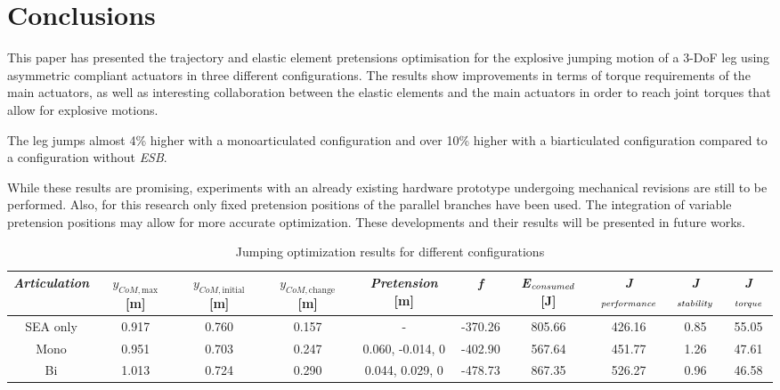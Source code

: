 \documentclass[letterpaper, 10 pt, conference]{ieeeconf}  %
\begin{document}
\section{Conclusions} \label{sec:conclusions} 

This paper has presented the trajectory and elastic element pretensions optimisation for the explosive jumping motion of a 3-DoF leg using asymmetric compliant actuators in three different configurations. The results show improvements in terms of torque requirements of the main actuators, as well as interesting collaboration between the elastic elements and the main actuators in order to reach joint torques that allow for explosive motions.

The leg jumps almost 4\% higher with a monoarticulated configuration and over 10\% higher with a biarticulated configuration compared to a configuration without \textit{ESB}.

While these results are promising, experiments with an already existing hardware prototype undergoing mechanical revisions are still to be performed. Also, for this research only fixed pretension positions of the parallel branches have been used. The integration of variable pretension positions may allow for more accurate optimization. These developments and their results will be presented in future works.

\begin{table}[ht]
	\caption{Jumping optimization results for different configurations}
	\label{maxheight}
	\begin{center}
		\begin{tabular}[t]{c|c|c||c|c|c|c|c|c|c}
			\textit{Articulation} &  $y_{CoM,\text{max}}$ [m] & $y_{CoM,\text{initial}}$ [m]& $y_{CoM,\text{change}}$ [m]& \textit{Pretension} [m] & \textit{f} & \textit{E}$_{\text{\textit{consumed}}}$ [J] & \textit{J}$_{\text{\textit{performance}}}$ & \textit{J}$_{\text{\textit{stability}}}$ & \textit{J}$_{\text{\textit{torque}}}$\\ 
			\hline
			SEA only& 0.917 &0.760  &0.157 &- &-370.26  & 805.66 & 426.16  &0.85  &   55.05\\
			\hline
			Mono &0.951 &0.703 &0.247 &  0.060, -0.014, 0  & -402.90 & 567.64& 451.77 & 1.26 &47.61 \\
			\hline
			Bi &1.013 &0.724 &0.290 &  0.044, 0.029, 0 & -478.73 & 867.35 & 526.27 & 0.96 & 46.58
		\end{tabular}
	\end{center}
\end{table}
\end{document}
